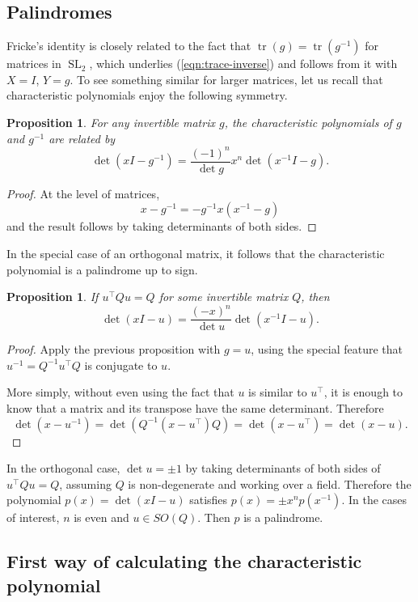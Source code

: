 \documentclass[11pt]{amsart}
\newtheorem{proposition}[theorem]{Proposition}
\theoremstyle{definition}
\numberwithin{figure}{section}
\numberwithin{equation}{section}
\numberwithin{table}{section}
\newcommand{\SL}{\operatorname{SL}}
\newcommand{\tr}{\operatorname{tr}}
\begin{document}
\subsection{Palindromes}

Fricke's identity is closely related to the fact that $\tr(g)=\tr(g^{-1})$ for matrices in $\SL_2$, which underlies (\ref{eqn:trace-inverse}) and follows from it with $X=I$, $Y=g$.
To see something similar for larger matrices, let us recall that characteristic polynomials enjoy the following symmetry.

\begin{proposition} \label{prop:palin}
For any invertible matrix $g$, the characteristic polynomials of $g$ and $g^{-1}$ are related by
\[
\det(xI-g^{-1}) = \frac{(-1)^n}{\det{g}} x^n \det(x^{-1}I-g).
\]
\end{proposition}
\begin{proof}
At the level of matrices,
\[
x-g^{-1} = -g^{-1} x (x^{-1}-g)
\]
and the result follows by taking determinants of both sides.
\end{proof}

In the special case of an orthogonal matrix, it follows that the characteristic polynomial is a palindrome up to sign.
\begin{proposition} \label{prop:palindrome}
If $u^{\top}Qu = Q$ for some invertible matrix $Q$, then
\[
\det(xI-u) = \frac{(-x)^n}{\det{u}} \det(x^{-1}I-u)
.
\]
\end{proposition}
\begin{proof}
Apply the previous proposition with $g=u$, using the special feature that $u^{-1}=Q^{-1}u^{\top}Q$ is conjugate to $u$.

More simply, without even using the fact that $u$ is similar to $u^{\top}$, it is enough to know that a matrix and its transpose have the same determinant. Therefore
\[
\det(x-u^{-1}) = \det(Q^{-1}(x-u^{\top})Q) = \det(x-u^{\top}) = \det(x-u).
\]
\end{proof}

In the orthogonal case, $\det{u}=\pm 1$ by taking determinants of both sides of $u^{\top}Qu=Q$, assuming $Q$ is non-degenerate and working over a field.
Therefore the polynomial $p(x)=\det(xI-u)$ satisfies $p(x)=\pm x^n p(x^{-1})$.
In the cases of interest, $n$ is even and $u \in SO(Q)$. Then $p$ is a palindrome.

\subsection{First way of calculating the characteristic polynomial}
\end{document}
